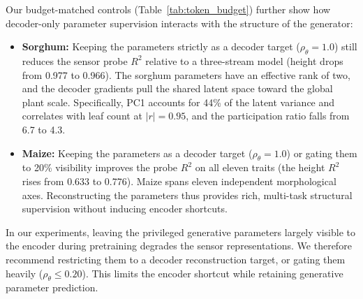 \documentclass[10pt,twocolumn,letterpaper]{article}
\begin{document}
Our budget-matched controls (Table~\ref{tab:token_budget}) further show how decoder-only parameter supervision interacts with the structure of the generator:
\begin{itemize}
  \item \textbf{Sorghum:} Keeping the parameters strictly as a decoder target ($\rho_\theta = 1.0$) still reduces the sensor probe $R^2$ relative to a three-stream model (height drops from 0.977 to 0.966). The sorghum parameters have an effective rank of two, and the decoder gradients pull the shared latent space toward the global plant scale. Specifically, PC1 accounts for 44\% of the latent variance and correlates with leaf count at $|r| = 0.95$, and the participation ratio falls from 6.7 to 4.3.
  \item \textbf{Maize:} Keeping the parameters as a decoder target ($\rho_\theta = 1.0$) or gating them to 20\% visibility improves the probe $R^2$ on all eleven traits (the height $R^2$ rises from 0.633 to 0.776). Maize spans eleven independent morphological axes. Reconstructing the parameters thus provides rich, multi-task structural supervision without inducing encoder shortcuts.
\end{itemize}
In our experiments, leaving the privileged generative parameters largely visible to the encoder during pretraining degrades the sensor representations. We therefore recommend restricting them to a decoder reconstruction target, or gating them heavily ($\rho_\theta \le 0.20$). This limits the encoder shortcut while retaining generative parameter prediction.
\end{document}
